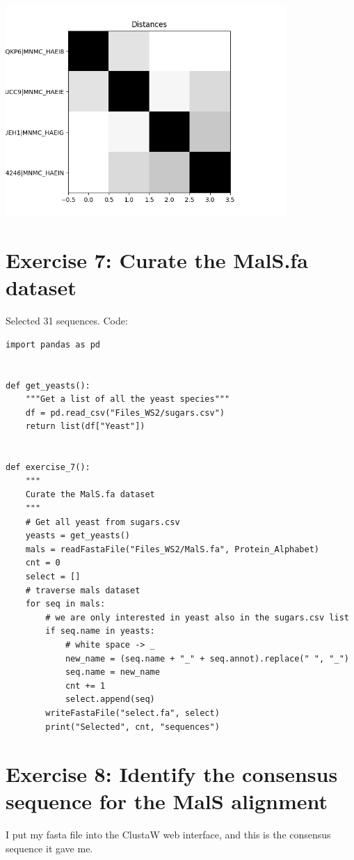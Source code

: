 \documentclass{article} %
\begin{document}
\includegraphics[width=0.8\textwidth]{images/poisson.png}

\section{Exercise 7: Curate the MalS.fa dataset}

Selected 31 sequences. Code:

\begin{verbatim}
import pandas as pd


def get_yeasts():
    """Get a list of all the yeast species"""
    df = pd.read_csv("Files_WS2/sugars.csv")
    return list(df["Yeast"])


def exercise_7():
    """
    Curate the MalS.fa dataset
    """
    # Get all yeast from sugars.csv
    yeasts = get_yeasts()
    mals = readFastaFile("Files_WS2/MalS.fa", Protein_Alphabet)
    cnt = 0
    select = []
    # traverse mals dataset
    for seq in mals:
        # we are only interested in yeast also in the sugars.csv list
        if seq.name in yeasts:
            # white space -> _
            new_name = (seq.name + "_" + seq.annot).replace(" ", "_")
            seq.name = new_name
            cnt += 1
            select.append(seq)
        writeFastaFile("select.fa", select)
        print("Selected", cnt, "sequences")
\end{verbatim}


\section{Exercise 8: Identify the consensus sequence for the MalS alignment}

I put my fasta file into the ClustaW web interface, and this is the consensus sequence it gave me.
\end{document}
